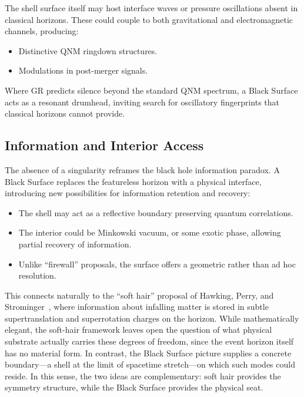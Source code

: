\documentclass[12pt]{article}
\begin{document}
The shell surface itself may host interface waves or pressure oscillations absent in classical horizons. These could couple to both gravitational and electromagnetic channels, producing:

\begin{itemize}
    \item Distinctive QNM ringdown structures.
    \item Modulations in post-merger signals.
\end{itemize}

Where GR predicts silence beyond the standard QNM spectrum, a Black Surface acts as a resonant drumhead, inviting search for oscillatory fingerprints that classical horizons cannot provide.

\subsection{Information and Interior Access}

The absence of a singularity reframes the black hole information paradox. A Black Surface replaces the featureless horizon with a physical interface, introducing new possibilities for information retention and recovery:

\begin{itemize}
    \item The shell may act as a reflective boundary preserving quantum correlations.
    \item The interior could be Minkowski vacuum, or some exotic phase, allowing partial recovery of information.
    \item Unlike ``firewall'' proposals, the surface offers a geometric rather than ad hoc resolution.
\end{itemize}

This connects naturally to the ``soft hair'' proposal of Hawking, Perry, and Strominger~\cite{hawking2016soft,hawking2018soft}, where information about infalling matter is stored in subtle supertranslation and superrotation charges on the horizon. While mathematically elegant, the soft-hair framework leaves open the question of what physical substrate actually carries these degrees of freedom, since the event horizon itself has no material form. In contrast, the Black Surface picture supplies a concrete boundary---a shell at the limit of spacetime stretch---on which such modes could reside. In this sense, the two ideas are complementary: soft hair provides the symmetry structure, while the Black Surface provides the physical seat.
\end{document}
